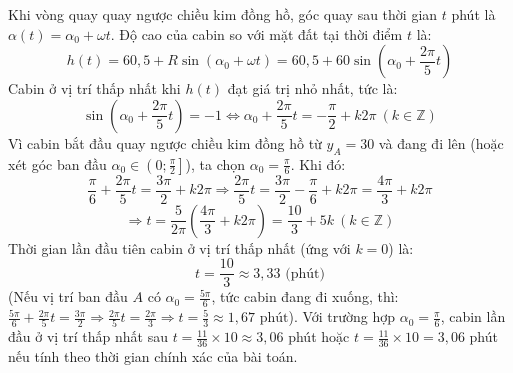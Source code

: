 \begin{baitap}
\begin{traloi}
		Khi vòng quay quay ngược chiều kim đồng hồ, góc quay sau thời gian $t$ phút là $\alpha(t) = \alpha_0 + \omega t$.
		Độ cao của cabin so với mặt đất tại thời điểm $t$ là:
		\[
		h(t) = 60{,}5 + R \sin(\alpha_0 + \omega t) = 60{,}5 + 60 \sin\left(\alpha_0 + \frac{2\pi}{5} t\right)
		\]
		Cabin ở vị trí thấp nhất khi $h(t)$ đạt giá trị nhỏ nhất, tức là:
		\[
		\sin\left(\alpha_0 + \frac{2\pi}{5} t\right) = -1 \Leftrightarrow \alpha_0 + \frac{2\pi}{5} t = -\frac{\pi}{2} + k2\pi \ (k \in \mathbb{Z})
		\]
		Vì cabin bắt đầu quay ngược chiều kim đồng hồ từ $y_A = 30$ và đang đi lên (hoặc xét góc ban đầu $\alpha_0 \in \left(0; \frac{\pi}{2}\right]$), ta chọn $\alpha_0 = \frac{\pi}{6}$.
		Khi đó:
		\[
		\frac{\pi}{6} + \frac{2\pi}{5} t = \frac{3\pi}{2} + k2\pi \Rightarrow \frac{2\pi}{5} t = \frac{3\pi}{2} - \frac{\pi}{6} + k2\pi = \frac{4\pi}{3} + k2\pi
		\]
		\[
		\Rightarrow t = \frac{5}{2\pi} \left(\frac{4\pi}{3} + k2\pi\right) = \frac{10}{3} + 5k \ (k \in \mathbb{Z})
		\]
		Thời gian lần đầu tiên cabin ở vị trí thấp nhất (ứng với $k = 0$) là:
		\[
		t = \frac{10}{3} \approx 3{,}33 \text{ (phút)}
		\]
		(Nếu vị trí ban đầu $A$ có $\alpha_0 = \frac{5\pi}{6}$, tức cabin đang đi xuống, thì:
		$\frac{5\pi}{6} + \frac{2\pi}{5} t = \frac{3\pi}{2} \Rightarrow \frac{2\pi}{5} t = \frac{2\pi}{3} \Rightarrow t = \frac{5}{3} \approx 1{,}67 \text{ phút}$).
		Với trường hợp $\alpha_0 = \frac{\pi}{6}$, cabin lần đầu ở vị trí thấp nhất sau $t = \frac{11}{36} \times 10 \approx 3{,}06$ phút hoặc $t = \frac{11}{36} \times 10 = 3{,}06$ phút nếu tính theo thời gian chính xác của bài toán.
	\end{traloi}
\end{baitap}
